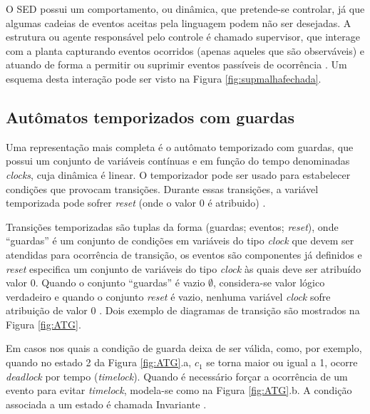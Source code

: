 O SED possui um comportamento, ou dinâmica, que pretende-se controlar, já que
algumas cadeias de eventos aceitas pela linguagem podem não ser desejadas. A
estrutura ou agente responsável pelo controle é chamado supervisor, que interage
com a planta capturando eventos ocorridos (apenas aqueles que são
observáveis) e atuando de forma a permitir ou suprimir eventos passíveis de
ocorrência \cite{book:SED}. Um esquema desta interação pode ser visto na Figura
\ref{fig:supmalhafechada}.



\subsection{Autômatos temporizados com guardas}

Uma representação mais completa é o autômato temporizado com guardas, que possui
um conjunto de variáveis contínuas e em função do tempo denominadas
\textit{clocks}, cuja dinâmica é linear. O temporizador pode ser usado para
estabelecer condições que provocam transições. Durante essas transições, a
variável temporizada pode sofrer \textit{reset} (onde o valor 0 é atribuido)
\cite{book:SED}.

Transições temporizadas são tuplas da forma (guardas; eventos;
\textit{reset}), onde ``guardas'' é um conjunto de condições em variáveis
do tipo \textit{clock} que devem ser atendidas para ocorrência de transição,
os eventos são componentes já definidos e \textit{reset} especifica um conjunto
de variáveis do tipo \textit{clock} às quais deve ser atribuído valor 0.
Quando o conjunto ``guardas'' é vazio $\emptyset$, considera-se valor
lógico verdadeiro e quando o conjunto \textit{reset} é vazio, nenhuma variável
\textit{clock} sofre atribuição de valor 0 \cite{book:SED}. Dois exemplo de
diagramas de transição são mostrados na Figura \ref{fig:ATG}. 



Em casos nos quais a condição de guarda deixa de ser válida, como, por exemplo,
quando no estado 2 da Figura \ref{fig:ATG}.a, $c_1$ se torna maior ou igual a 1, ocorre
\textit{deadlock} por tempo (\textit{timelock}). Quando é necessário forçar a
ocorrência de um evento para evitar \textit{timelock}, modela-se como na Figura
\ref{fig:ATG}.b. A condição associada a um estado é chamada Invariante
\cite{book:SED}.


